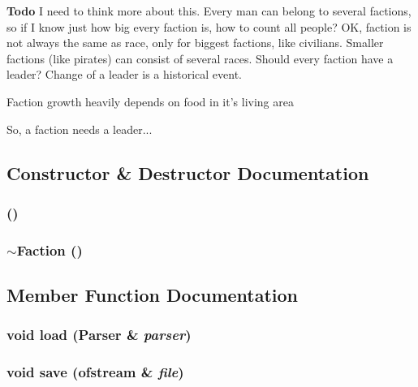 \begin{Desc}
\item[{\bf Todo}]I need to think more about this. Every man can belong to several factions, so if I know just how big every faction is, how to count all people? OK, faction is not always the same as race, only for biggest factions, like civilians. Smaller factions (like pirates) can consist of several races. Should every faction have a leader? Change of a leader is a historical event.\end{Desc}
Faction growth heavily depends on food in it's living area

So, a faction needs a leader...



\subsection{Constructor \& Destructor Documentation}
\subsubsection{ ()}\label{classFaction_a0}


\subsubsection{\setlength{\rightskip}{0pt plus 5cm}$\sim${\bf Faction} ()\hspace{0.3cm}{\tt  [virtual]}}\label{classFaction_a1}




\subsection{Member Function Documentation}
\subsubsection{\setlength{\rightskip}{0pt plus 5cm}void load ({\bf Parser} \& {\em parser})\hspace{0.3cm}{\tt  [virtual]}}\label{classFaction_a2}


\subsubsection{\setlength{\rightskip}{0pt plus 5cm}void save (ofstream \& {\em file})\hspace{0.3cm}{\tt  [virtual]}}\label{classFaction_a3}




